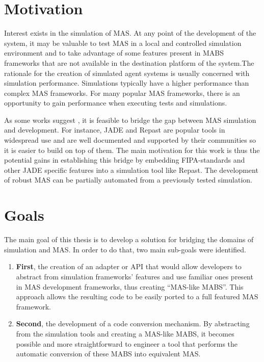 \section{Motivation}
Interest exists in the simulation of MAS. At any point of the development of the system, it may be valuable to test MAS in a local and controlled simulation environment and to take advantage of some features present in MABS frameworks that are not available in the destination platform of the system.The rationale for the creation of simulated agent systems is usually concerned with simulation performance. Simulations typically have a higher performance than complex MAS frameworks. For many popular MAS frameworks, there is an opportunity to gain performance when executing tests and simulations. 

As some works suggest \cite{gormer2011jrep,garcia2011misia,warden2010towards}, it is feasible to bridge the gap between MAS simulation and development. For instance, JADE and Repast are popular tools in widespread use and are well documented and supported by their communities so it is easier to build on top of them. The main motivation for this work is thus the potential gains in establishing this bridge by embedding FIPA-standards and other JADE specific features into a simulation tool like Repast. The development of robust MAS can be partially automated from a previously tested simulation.

\section{Goals}
The main goal of this thesis is to develop a solution for bridging the domains of simulation and MAS. In order to do that, two main sub-goals were identified.

\begin{enumerate}
	\item \textbf{First}, the creation of an adapter or API that would allow developers to abstract from simulation frameworks' features and use familiar ones present in MAS development frameworks, thus creating ``MAS-like MABS''. This approach allows the resulting code to be easily ported to a full featured MAS framework.
	\item \textbf{Second}, the development of a code conversion mechanism. By abstracting from the simulation tools and creating a MAS-like MABS, it becomes possible and more straightforward to engineer a tool that performs the automatic conversion of these MABS into equivalent MAS.
\end{enumerate}

